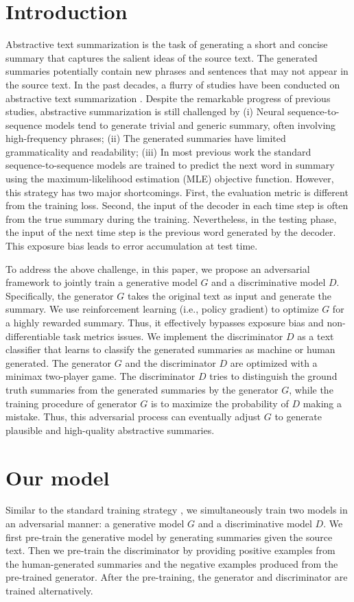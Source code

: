 \documentclass[letterpaper]{article} \usepackage{aaai18}  \usepackage{times}  \usepackage{helvet}  \usepackage{courier}  \usepackage{url}  \usepackage{graphicx}  \frenchspacing  \usepackage{multirow}
\begin{document}
\section{Introduction}
Abstractive text summarization is the task of generating a short and concise summary that captures the salient ideas of the source text.  The generated summaries potentially contain new phrases and sentences that may not appear in the source text. 
In the past decades, a flurry of studies have been conducted on abstractive text summarization \cite{nallapati2016abstractive,see2017get,paulus2017deep}. Despite the remarkable progress of previous studies, abstractive summarization is still challenged by (i) Neural sequence-to-sequence models tend to generate trivial and generic summary, often involving high-frequency phrases; (ii) The generated summaries have limited grammaticality and readability; (iii) In most previous work the standard sequence-to-sequence models are trained to predict the next word in summary using the maximum-likelihood estimation (MLE) objective function. However, this strategy has two major shortcomings. First, the evaluation metric is different from the training loss. Second, the input of the decoder in each time step is often from the true summary during the training. Nevertheless, in the testing phase, the input of the next time step is the previous word generated by the decoder. This exposure bias leads to error accumulation at test time.

To address the above challenge, in this paper, we propose an adversarial framework to jointly train a generative model $G$ and a discriminative model $D$.  Specifically, the generator $G$ takes the original text as input and generate the summary. We use reinforcement learning (i.e., policy gradient) to optimize $G$ for a highly rewarded summary. Thus, it effectively bypasses exposure bias and non-differentiable task metrics issues.  We implement the discriminator $D$ as a text classifier that learns to classify the generated summaries as machine or human generated. The generator $G$ and the discriminator $D$ are optimized with a minimax two-player game. The discriminator $D$ tries to distinguish the ground truth summaries from the generated summaries by the generator $G$, while the training procedure of generator $G$ is to maximize the probability of $D$ making a mistake. Thus, this adversarial process can eventually adjust $G$ to generate plausible and high-quality abstractive summaries.


\section{Our model}
Similar to the standard training strategy \cite{goodfellow2014generative}, we simultaneously train two models in an adversarial manner: a generative model $G$ and a discriminative model $D$.  We first pre-train the generative model by generating summaries given the source text. Then we pre-train the discriminator by providing positive examples from the human-generated summaries and the negative examples produced from the pre-trained generator. After the pre-training, the generator and discriminator are trained alternatively.
\end{document}
